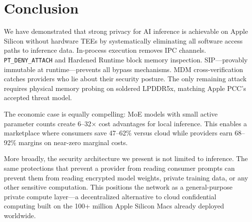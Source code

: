 \documentclass[10pt,twocolumn,letterpaper]{article}
\begin{document}
\section{Conclusion}

We have demonstrated that strong privacy for AI inference is achievable on Apple Silicon without hardware TEEs by systematically eliminating all software access paths to inference data. In-process execution removes IPC channels. \texttt{PT\_DENY\_ATTACH} and Hardened Runtime block memory inspection. SIP---provably immutable at runtime---prevents all bypass mechanisms. MDM cross-verification catches providers who lie about their security posture. The only remaining attack requires physical memory probing on soldered LPDDR5x, matching Apple PCC's accepted threat model.

The economic case is equally compelling: MoE models with small active parameter counts create 6--32$\times$ cost advantages for local inference. This enables a marketplace where consumers save 47--62\% versus cloud while providers earn 68--92\% margins on near-zero marginal costs.

More broadly, the security architecture we present is not limited to inference. The same protections that prevent a provider from reading consumer prompts can prevent them from reading encrypted model weights, private training data, or any other sensitive computation. This positions the network as a general-purpose private compute layer---a decentralized alternative to cloud confidential computing built on the 100+ million Apple Silicon Macs already deployed worldwide.
\end{document}

